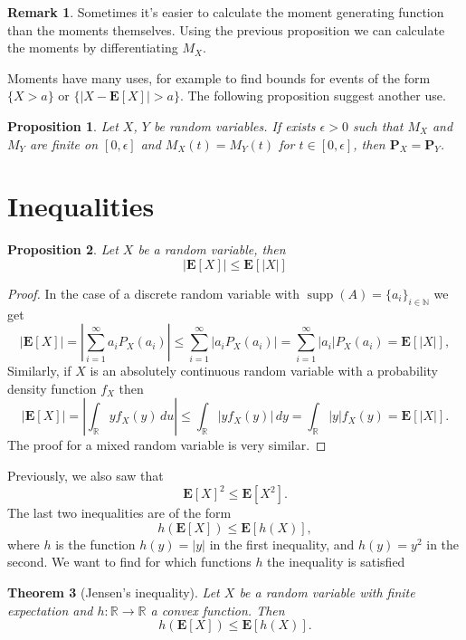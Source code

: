 \documentclass[11pt,a4paper]{article}
\theoremstyle{definition}
\newtheorem{remark}{Remark}[section]
\theoremstyle{plain}
\newtheorem{theorem}{Theorem}[section]
\newtheorem{proposition}[theorem]{Proposition}
\DeclareMathOperator{\supp}{supp}
\newcommand{\N}{\mathbb{N}}
\newcommand{\R}{\mathbb{R}}
\newcommand{\E}{\mathbf{E}}
\newcommand{\Prob}{\mathbf{P}}
\newcommand{\abs}[1]{\left\lvert #1\right\rvert}
\begin{document}
  \begin{remark}
    Sometimes it's easier to calculate the moment generating function than
    the moments themselves. Using the previous proposition we can calculate
    the moments by differentiating $M_X$.
  \end{remark}

  Moments have many uses, for example to find bounds for events of the
  form $\{X > a\}$ or $\{\abs{X - \E[X]} > a\}$. The following
  proposition suggest another use.

  \begin{proposition}
    Let $X$, $Y$ be random variables. If exists $\epsilon > 0$ such that 
    $M_X$ and $M_Y$ are finite on $[0,\epsilon]$ and $M_X(t) = M_Y(t)$
    for $t \in [0,\epsilon]$, then $\Prob_X = \Prob_Y$.
  \end{proposition}

  \newpage

  \section{Inequalities}
  \begin{proposition}
    Let $X$ be a random variable, then
    \[
      \abs{\E[X]} \le \E[\abs{X}]
    \]
  \end{proposition}
  \begin{proof}
  In the case of a discrete random variable with 
  $\supp(A) = \{a_i\}_{i \in \N}$ we get
    \[
      |\E[X]|=
      \abs{\sum_{i=1}^{\infty} a_{i} P_{X}(a_{i})} \leq
      \sum_{i=1}^{\infty} \abs{a_{i} P_{X}(a_{i})} =
      \sum_{i=1}^{\infty} \abs{a_{i}} P_{X}(a_{i}) =
      \E[|X|],
    \]
    Similarly, if $X$ is an absolutely continuous random variable with
    a probability density function $f_X$ then
    \[
      \abs{\E[X]} =
      \abs{\int_{\R}y f_{X}(y)\,du} \leq
      \int_{\R} \abs{y f_{X}(y)}\,dy =
      \int_{\R} \abs{y} f_{X}(y) =
      \E[\abs{X}].
    \]
    The proof for a mixed random variable is very similar.
  \end{proof}

  Previously, we also saw that
  \[
    \E[X]^{2} \leq \E[X^{2}].
  \]
  The last two inequalities are of the form
  \[
    h(\E[X])\leq\E[h(X)],
  \]
  where $h$ is the function $h(y) = \abs{y}$ in the first inequality, and
  $h(y) = y^2$ in the second.
  We want to find for which functions $h$ the inequality is satisfied

  \begin{theorem}[Jensen's inequality]
    Let $X$ be a random variable with finite expectation and 
    $h \colon \R \to \R$ a convex function. Then
    \[
      h(\E[X])\leq\E[h(X)].
    \]
  \end{theorem}
\end{document}
